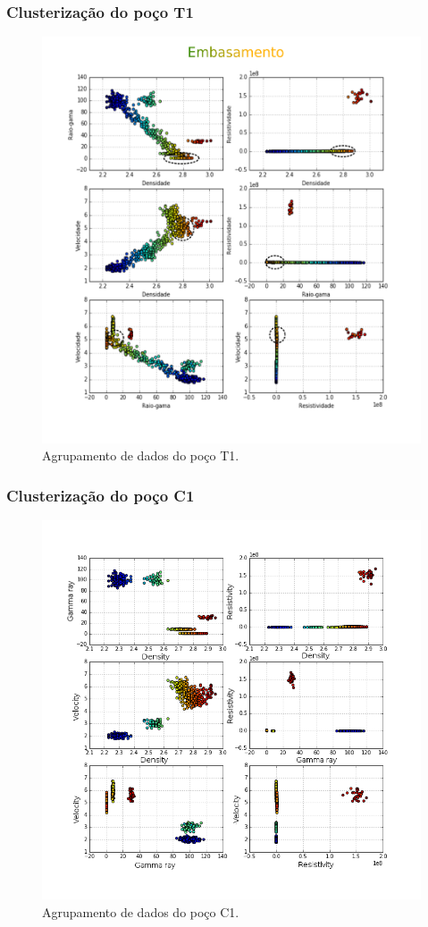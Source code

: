 \documentclass[aspectratio=10]{beamer} %
\begin{document}
\begin{frame}
\frametitle{Clusterização do poço T1}
\begin{figure}[H]
\centering
\includegraphics[scale=0.4]{Imagens/embasamento.png}
\caption{Agrupamento de dados do poço T1.}
\label{clusterT1}
\end{figure} 
\end{frame}

\begin{frame}
\frametitle{Clusterização do poço C1}
\begin{figure}[H]
\centering
\includegraphics[scale=0.3]{Imagens/cluterpocoC1.png}
\caption{Agrupamento de dados do poço C1.}
\label{clusterC1}
\end{figure} 
\end{frame}
\end{document}
